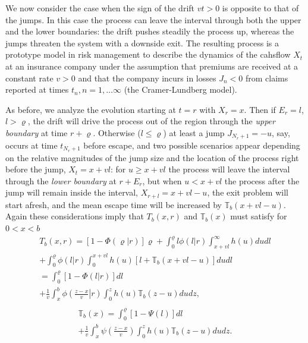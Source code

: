 \documentclass[english,aps,a4paper,twocolumn,showpacs,showkeys,amsfonts,amsmath,amssymb,amscd,nofootinbib]{revtex4}
\newcommand{\1}{\'\i}
\newcommand{\TT}{\mathbb{T}}\newcommand{\FF}{\mathbb{F}}
\begin{document}
 We now consider the  case when  the sign  of the drift $vt>0$  is
opposite to that of the   jumps.
  In this case the process can leave the
interval through both the upper and the lower boundaries: the
drift pushes steadily the process up, whereas the jumps threaten
the system with a downside exit.   The   resulting process  is
 a prototype  model in  risk management to describe   the
dynamics of the cahsflow  $X_t$ at an insurance company  under
the assumption  that premiums are received at a constant rate
$v>0$ and that  the company incurs in losses $J_n<0$
  from
claims reported at times $t_n, n=1,\dots\infty$   (the
Cramer-Lundberg model).

 As before, we analyze the evolution starting  at $t=r$ with $X_r=x$. Then if
$E_r=l$, $l > \varrho$,
  the drift will drive the
process out of the region through the {\it upper boundary\/} at time
$r+\varrho$. Otherwise  ($l \leqslant \varrho$) at least a jump
$J_{N_r+1}=-u$,  say, occurs at time $t_{N_r+1}$  before escape, and two possible scenarios appear depending on the relative magnitudes of the jump size and the location of the process right before the jump, $X_t=x+v l$: for $u\geqslant x+v l$ the
process will leave the interval through the {\it lower boundary\/} at $r+E_r$, but when $u<x+v l$ the process after the jump will remain inside the interval, $X_{r+l}=x+v l-u$, the exit problem will start afresh, and the mean escape time will be increased by $\TT_b\left(x+v l-u\right)$.  Again these considerations imply
that $T_b(x,r)$ and $\TT_b(x)$ must satisfy for $0< x< b$
\begin{eqnarray}
T_b(x,r)=\left[1-\Phi\left(\varrho|r\right)\right] \varrho +
\int^{\varrho}_{0} l
\phi(l|r) \int^{\infty}_{x+v l} h(u) d  ud  l \nonumber \\
+\int^{\varrho}_{0} \phi(l|r) \int^{x+vl}_{0} h(u)
 \left[l+\TT_b\left(x+vl-u\right)\right]d  ud  l\nonumber \\
=
\int^{\varrho}_{0}\left[1-\Phi\left(l|r\right)\right]d  l \nonumber \\
+
\frac{1}{v}\int^{b}_{x}
\phi\left(\left.\frac{z-x}{v}\right|r\right) \int^{z}_{0} h(u)
\TT_b\left(z-u\right)d  ud  z,\nonumber \\ \label{Tb_down}  
\end{eqnarray}
\begin{eqnarray}
\TT_b(x)= \int^{\varrho}_{0}\left[1-\Psi(l)\right]d  l
\nonumber \\
+\frac{1}{v} \int^{b}_{x} \psi\left(\frac{z-x}{v}\right)
\int^{z}_{0} h(u) \TT_b\left(z-u\right)d  ud  z. \nonumber \\ \label{TTb_down}
\end{eqnarray}
\end{document}
